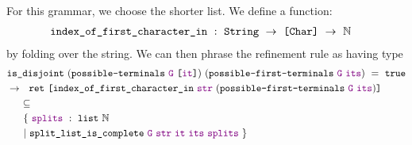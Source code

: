    For this grammar, we choose the shorter list.  We define a function:
\begin{align*}
&\texttt{index\_of\_first\_character\_in}~:~\texttt{String}~\to~\texttt{[}\texttt{Char}\texttt{]}~\to~\mathbb{N}
\end{align*}
   by folding over the string.  We can then phrase the refinement rule as having type
\begin{align*}
&\fname{is\_disjoint}~(\fname{possible-terminals}~\farg{G}~\valuelist{\farg{it}})~(\fname{possible-first-terminals}~\farg{G}~\farg{its})~=~\true \\
&\to~~\fname{ret}~\valuelist{\fname{index\_of\_first\_character\_in}~\farg{str}~(\fname{possible-first-terminals}~\farg{G}~\farg{its})} \\
&\phantom{\to~}\subseteq \\
&\ndcompfor[\phantom{\to~~}]{\farg{it}}{\farg{its}}
\end{align*}
%
%
%
%
%  
%  
%
%
